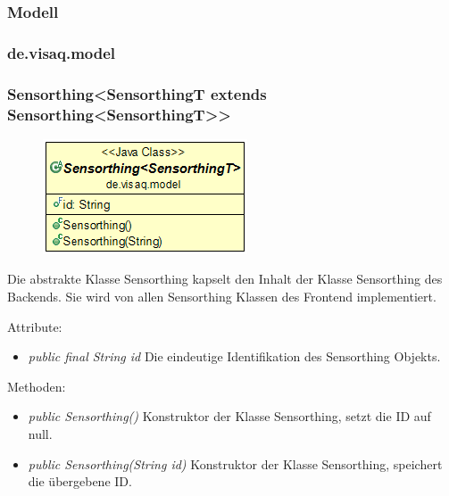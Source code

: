 \subsubsection{Modell}

\subsubsection{de.visaq.model}

\subsubsection {Sensorthing<SensorthingT extends Sensorthing<SensorthingT>>}
\begin{minipage}{0.3\textwidth}
	\begin{figure}[H]
		\includegraphics[scale = 0.5
		]{media/frontend/model/Sensorthing_Class.png}
	\end{figure}
\end{minipage} \hfill
\begin{minipage}{0.6\textwidth}
	Die abstrakte Klasse Sensorthing kapselt den Inhalt der Klasse Sensorthing des Backends. Sie wird von allen Sensorthing Klassen des Frontend implementiert.
\end{minipage}

Attribute:
\begin{itemize} 
	\item \emph{public final String id} Die eindeutige Identifikation des Sensorthing Objekts.
\end{itemize}
Methoden:
\begin{itemize} 
	\item \emph{public Sensorthing()} Konstruktor der Klasse Sensorthing, setzt die ID auf null.
	\item \emph{public Sensorthing(String id)} Konstruktor der Klasse Sensorthing, speichert die übergebene ID.
\end{itemize}

